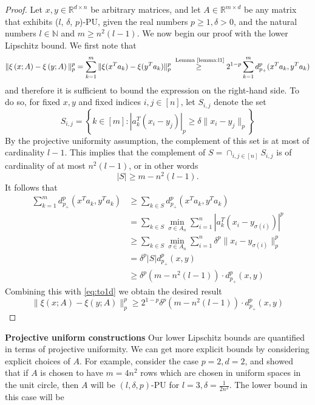 \documentclass{amsart}
\theoremstyle{plain}
\theoremstyle{definition}
\theoremstyle{remark}
\newcommand{\RR}{\mathbb{R}}
\newcommand{\NN}{\mathbb{N}}
\newcommand{\abs}[1]{\left\lvert#1\right\rvert}
\begin{document}
\begin{proof}
Let $x, y \in \RR^{d \times n}$ be arbitrary matrices, and let $A \in \RR^{m \times d}$ be any matrix that exhibits ($l$, $\delta$, $p$)-PU, given the real numbers $p \geq 1, \delta > 0$, and the natural numbers $l \in \NN$ and $m \geq n^2(l-1)$.  We now begin our proof with the lower Lipschitz bound. We first note that 
\begin{equation}\label{eq:to1d}
\|\xi\left(x ; A \right) - \xi\left(y ; A \right)\|_p^p=\sum_{k=1}^m \|\xi(x^Ta_k) - \xi(y^Ta_k)\|_p^p \stackrel{\text{ Lemma \ref{lemma:l1}}}{\geq} 2^{1-p} \sum_{k=1}^m d_{p_+}^p(x^Ta_k,y^Ta_k)
\end{equation}
and therefore it is sufficient to bound the expression on the right-hand side. To do so, for fixed $x,y$ and fixed indices $i,j\in [n]$, let $S_{i,j}$ denote the set 
\begin{equation}
   S_{i,j}=\left\{k\in [m] :  \abs{a_k^T(x_i-y_j)}_p \geq \delta \|x_i-y_j\|_p \right\} 
\end{equation}
By the projective uniformity assumption, the complement of this set is at most of cardinality $l-1$. This implies that the complement of $S=\cap_{i,j\in [n]}S_{i,j} $ is of cardinality of at most $n^2(l-1)$, or in other words 
\begin{equation}
  |S|\geq m-n^2(l-1).   
\end{equation}
It follows that 
\begin{equation} \begin{split}\sum_{k=1}^m d_{p_+}^p(x^Ta_k,y^Ta_k)&\geq \sum_{k\in S} d_{p_+}^p(x^Ta_k,y^Ta_k)\\
&= \sum_{k\in S} {\min_{\sigma \in A_n}{
\sum_{i=1}^{n}{
\abs{a_k^T\left(x_i - y_{\sigma(i)} \right)}^p}}} \\
&\geq  \sum_{k\in S} {\min_{\sigma \in A_n}{
\sum_{i=1}^{n}{
\delta^p \|x_i-y_{\sigma(i)}\|_p^p}}}\\
&=\delta^p|S|d_{p_+}^p(x,y)\\
&\geq \delta^p(m-n^2(l-1))\cdot d_{p_+}^p(x,y)
\end{split} \end{equation}
Combining this with \eqref{eq:to1d} we obtain the desired result 
\begin{equation}
   \|\xi\left(x ; A \right) - \xi\left(y ; A \right)\|_p^p\geq 2^{1-p} \delta^p(m-n^2(l-1))\cdot d_{p_+}^p(x,y) 
\end{equation}
\end{proof}
\textbf{Projective uniform constructions} Our lower Lipschitz bounds are quantified in terms of projective uniformity. We can get more explicit bounds by considering explicit choices of $A$. For example, \cite{dym2025quantitativeboundssortingbasedpermutationinvariant} consider the case $p=2,d=2$, and showed that if $A$ is chosen to have  $m=4n^2$ rows which are chosen in uniform spaces in the unit circle, then $A$ will be $(l,\delta,p)$-PU for $l=3,\delta=\frac{1}{2n^2}$. The lower bound in this case will be 
\end{document}
